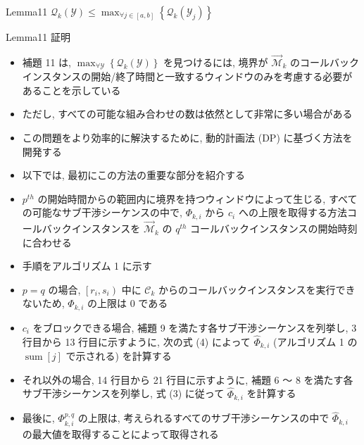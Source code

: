 \begin{frame}{Lemma11}
    $\mathcal{Q}_{k}(\mathcal{Y}) \leq \max _{\forall j \in[a, b]}\left\{\mathcal{Q}_{k}\left(\mathcal{Y}_{j}\right)\right\}$
\end{frame}

\begin{frame}{Lemma11 証明}
    \todo{}
\end{frame}

\begin{frame}{}
    \begin{itemize}
        \item 補題 11 は, $\max _{\forall \mathcal{Y}}\left\{\mathcal{Q}_{k}(\mathcal{Y})\right\}$ を見つけるには, 境界が $\overrightarrow{\mathcal{M}}_{k}$ のコールバックインスタンスの開始/終了時間と一致するウィンドウのみを考慮する必要があることを示している
        \item ただし, すべての可能な組み合わせの数は依然として非常に多い場合がある
        \item この問題をより効率的に解決するために, 動的計画法 (DP) に基づく方法を開発する
    \end{itemize}
\end{frame}

\begin{frame}{}
    \begin{itemize}
        \item 以下では, 最初にこの方法の重要な部分を紹介する
        \item $p^{t h}$ の開始時間からの範囲内に境界を持つウィンドウによって生じる, すべての可能なサブ干渉シーケンスの中で, $\Phi_{k, i}$ から $c_{i}$ への上限を取得する方法コールバックインスタンスを $\overrightarrow{\mathcal{M}}_{k}$ の $q^{t h}$ コールバックインスタンスの開始時刻に合わせる
    \end{itemize}
\end{frame}

\begin{frame}{}
    \begin{itemize}
        \item 手順をアルゴリズム 1 に示す
        \item $p=q$ の場合, $\left[r_{i}, s_{i}\right)$ 中に $\mathcal{C}_{k}$ からのコールバックインスタンスを実行できないため, $\Phi_{k, i}$ の上限は 0 である
        \item $c_{i}$ をブロックできる場合, 補題 9 を満たす各サブ干渉シーケンスを列挙し, 3 行目から 13 行目に示すように, 次の式 (4) によって $\hat{\Phi}_{k, i}$ (アルゴリズム 1 の $\operatorname{sum}[j]$ で示される) を計算する
        \item それ以外の場合, 14 行目から 21 行目に示すように, 補題 6 ～ 8 を満たす各サブ干渉シーケンスを列挙し, 式 (3) に従って $\hat{\Phi}_{k, i}$ を計算する
        \item 最後に, $\Phi_{k, i}^{p, q}$ の上限は, 考えられるすべてのサブ干渉シーケンスの中で $\hat{\Phi}_{k, i}$ の最大値を取得することによって取得される
    \end{itemize}
\end{frame}

